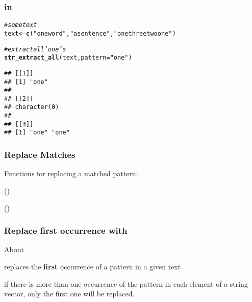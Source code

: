 \documentclass[12pt]{beamer}\usepackage[]{graphicx}\usepackage[]{color}
\makeatletter
\newcommand{\hlstr}[1]{\textcolor[rgb]{0.192,0.494,0.8}{#1}}%
\newcommand{\hlcom}[1]{\textcolor[rgb]{0.678,0.584,0.686}{\textit{#1}}}%
\newcommand{\hlstd}[1]{\textcolor[rgb]{0.345,0.345,0.345}{#1}}%
\newcommand{\hlkwb}[1]{\textcolor[rgb]{0.69,0.353,0.396}{#1}}%
\newcommand{\hlkwc}[1]{\textcolor[rgb]{0.333,0.667,0.333}{#1}}%
\newcommand{\hlkwd}[1]{\textcolor[rgb]{0.737,0.353,0.396}{\textbf{#1}}}%
\newenvironment{kframe}{%
 \def\at@end@of@kframe{}%
 \ifinner\ifhmode%
  \def\at@end@of@kframe{\end{minipage}}%
  \begin{minipage}{\columnwidth}%
 \fi\fi%
 \def\FrameCommand##1{\hskip\@totalleftmargin \hskip-\fboxsep
 \colorbox{shadecolor}{##1}\hskip-\fboxsep
     \hskip-\linewidth \hskip-\@totalleftmargin \hskip\columnwidth}%
 \MakeFramed {\advance\hsize-\width
   \@totalleftmargin\z@ \linewidth\hsize
   \@setminipage}}%
 {\par\unskip\endMakeFramed%
 \at@end@of@kframe}
\newenvironment{knitrout}{}{} %
\makeatother
\begin{document}

\begin{frame}[fragile]
\frametitle{ in }

\begin{knitrout}\footnotesize
{}\color{fgcolor}\begin{kframe}
\begin{alltt}
\hlcom{# some text}
\hlstd{text} \hlkwb{<-} \hlkwd{c}\hlstd{(}\hlstr{"one word"}\hlstd{,} \hlstr{"a sentence"}\hlstd{,} \hlstr{"one three two one"}\hlstd{)}

\hlcom{# extract all 'one's}
\hlkwd{str_extract_all}\hlstd{(text,} \hlkwc{pattern} \hlstd{=} \hlstr{"one"}\hlstd{)}
\end{alltt}
\begin{verbatim}
## [[1]]
## [1] "one"
## 
## [[2]]
## character(0)
## 
## [[3]]
## [1] "one" "one"
\end{verbatim}
\end{kframe}
\end{knitrout}

\end{frame}


\begin{frame}
\begin{center}
\Huge{}
\end{center}
\end{frame}


\begin{frame}
\frametitle{Replace Matches}

Functions for replacing a matched pattern: 
\bbi
  \item {}
  \item {}
  \item {} ()
  \item {} ()
\ei

\end{frame}


\begin{frame}
\frametitle{Replace first occurrence with }

About {\hilit {}}
\bbi
  \item {} replaces the \textbf{first} occurrence of a pattern in a given text
  \item if there is more than one occurrence of the pattern in each element of a string vector, only the first one will be replaced.
\ei

\end{frame}
\end{document}
